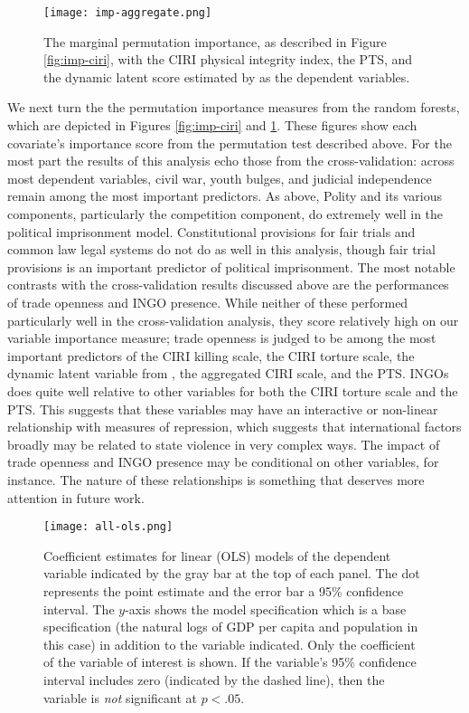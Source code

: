 \documentclass[12pt]{article}
\begin{document}
\begin{figure}[!htpb]
\centering
\texttt{[image: imp-aggregate.png]}
\caption{The marginal permutation importance, as described in Figure \ref{fig:imp-ciri}, with the CIRI physical integrity index, the PTS, and the dynamic latent score estimated by \citet{Fariss2013} as the dependent variables.}
\label{fig:imp-aggregate}
\end{figure}

We next turn the the permutation importance measures from the random forests, which are depicted in Figures \ref{fig:imp-ciri} and \ref{fig:imp-aggregate}. These figures show each covariate's importance score from the permutation test described above. For the most part the results of this analysis echo those from the cross-validation: across most dependent variables, civil war, youth bulges, and judicial independence remain among the most important predictors. As above, Polity and its various components, particularly the competition component, do extremely well in the political imprisonment model. Constitutional provisions for fair trials and common law legal systems do not do as well in this analysis, though fair trial provisions is an important predictor of political imprisonment. The most notable contrasts with the cross-validation results discussed above are the performances of trade openness and INGO presence. While neither of these performed particularly well in the cross-validation analysis, they score relatively high on our variable importance measure; trade openness is judged to be among the most important predictors of the CIRI killing scale, the CIRI torture scale, the dynamic latent variable from \citet{Fariss2013}, the aggregated CIRI scale, and the PTS. INGOs does quite well relative to other variables for both the CIRI torture scale and the PTS. This suggests that these variables may have an interactive or non-linear relationship with measures of repression, which suggests that international factors broadly may be related to state violence in very complex ways. The impact of trade openness and INGO presence may be conditional on other variables, for instance. The nature of these relationships is something that deserves more attention in future work.

\begin{figure}[!htpb]
\texttt{[image: all-ols.png]}
\caption{Coefficient estimates for linear (OLS) models of the dependent variable indicated by the gray bar at the top of each panel. The dot represents the point estimate and the error bar a 95\% confidence interval. The $y$-axis shows the model specification which is a base specification (the natural logs of GDP per capita and population in this case) in addition to the variable indicated. Only the coefficient of the variable of interest is shown. If the variable's 95\% confidence interval includes zero (indicated by the dashed line), then the variable is \textit{not} significant at $p < .05$.}
\label{fig:all-ols}
\end{figure}
\end{document}
